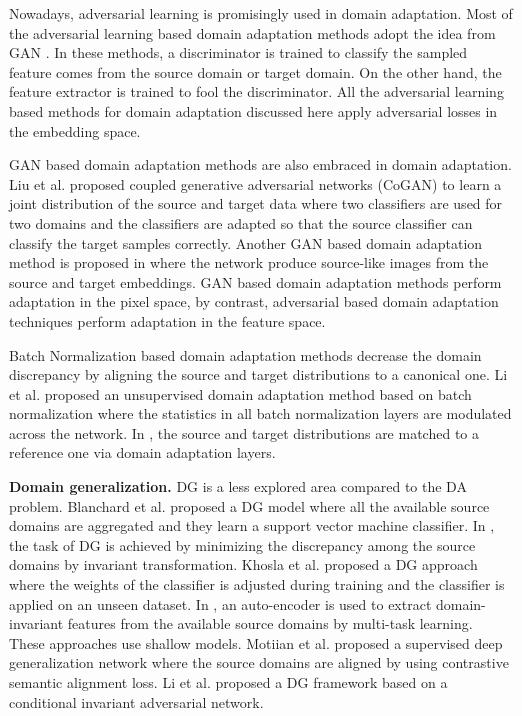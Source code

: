 \documentclass[review]{elsarticle}
\begin{document}
Nowadays, adversarial learning is promisingly used in domain adaptation. Most of the adversarial learning based domain adaptation methods \cite{pmlr-v37-ganin15,8099799} adopt the idea from GAN \cite{NIPS2014_5423}. In these methods, a discriminator is trained to classify the sampled feature comes from the source domain or target domain. On the other hand, the feature extractor is trained to fool the discriminator. All the adversarial learning based methods for domain adaptation discussed here apply adversarial losses in the embedding space. 


GAN based domain adaptation methods \cite{NIPS2016_6544,Gen2Adapt,Hong_2018_CVPR,Hu_2018_CVPR} are also embraced in domain adaptation. Liu et al. proposed coupled generative adversarial networks (CoGAN) \cite{NIPS2016_6544} to learn a joint distribution of the source and target data where two classifiers are used for two domains and the classifiers are adapted so that the source classifier can classify the target samples correctly. Another GAN based domain adaptation method is proposed in \cite{Gen2Adapt} where the network produce source-like images from the source and target embeddings. GAN based domain adaptation methods perform adaptation in the pixel space, by contrast, adversarial based domain adaptation techniques perform adaptation in the feature space. 

Batch Normalization based domain adaptation methods \cite{DBLP:journals/corr/LiWSLH16,carlucci2017auto} decrease the domain discrepancy by aligning the source and target distributions to a canonical one. Li et al. \cite{DBLP:journals/corr/LiWSLH16} proposed an unsupervised domain adaptation method based on batch normalization where the statistics in all batch normalization layers are modulated across the network. In \cite{carlucci2017auto}, the source and target distributions are matched to a reference one via domain adaptation layers. 



\textbf{Domain generalization.} DG is a less explored area compared to the DA problem. Blanchard et al. \cite{NIPS2011_4312} proposed a DG model where all the available source domains are aggregated and they learn a support vector machine classifier. In \cite{Muandet:2013:DGV:3042817.3042820}, the task of DG is achieved by minimizing the discrepancy among the source domains by invariant transformation. Khosla et al. \cite{Khosla:2012:UDD:2402940.2402953} proposed a DG approach where the weights of the classifier is adjusted during training and the classifier is applied on an unseen dataset. In \cite{DBLP:conf/iccv/GhifaryKZB15}, an auto-encoder is used to extract domain-invariant features from the available source domains by multi-task learning. These approaches\cite{NIPS2011_4312,Muandet:2013:DGV:3042817.3042820, Khosla:2012:UDD:2402940.2402953,DBLP:conf/iccv/GhifaryKZB15} use shallow models. Motiian et al. \cite{motiian2017CCSA} proposed a supervised deep generalization network where the source domains are aligned by using contrastive semantic alignment loss. Li et al. \cite{Li2018eccv} proposed a DG framework based on a conditional invariant adversarial network.
\end{document}

